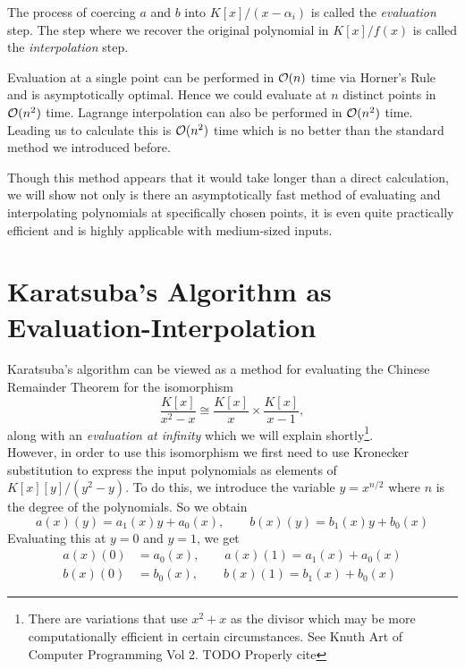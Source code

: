 The process of coercing $a$ and $b$ into $K[x]/ (x - \alpha_i)$ is called the \emph{evaluation} step. The step where we recover the original polynomial in $K[x]/f(x)$ is called the \emph{interpolation} step.

\medskip

Evaluation at a single point can be performed in $\mathcal O(n)$ time via Horner's Rule and is asymptotically optimal. Hence we could evaluate at $n$ distinct points in $\mathcal O(n^2)$ time. Lagrange interpolation can also be performed in $\mathcal O(n^2)$ time. Leading us to calculate this is $\mathcal O(n^2)$ time which is no better than the standard method we introduced before.

Though this method appears that it would take longer than a direct calculation, we will show not only is there an asymptotically fast method of evaluating and interpolating polynomials at specifically chosen points, it is even quite practically efficient and is highly applicable with medium-sized inputs.

\section{Karatsuba's Algorithm as Evaluation-Interpolation}%
\label{sec:Karatsuba's Algorithms as Evaluation-Interpolation}

Karatsuba's algorithm can be viewed as a method for evaluating the Chinese Remainder Theorem for the isomorphism
\[
    \frac{K[x]}{x^2 - x} \cong \frac{K[x]}{x} \times \frac{K[x]}{x-1},
\]
along with an \emph{evaluation at infinity} which we will explain shortly\footnote{There are variations that use $x^2 + x$ as the divisor which may be more computationally efficient in certain circumstances. See Knuth Art of Computer Programming Vol 2. TODO Properly cite}.\\
However, in order to use this isomorphism we first need to use Kronecker substitution to express the input polynomials as elements of $K[x][y]/(y^2 - y)$. To do this, we introduce the variable $y = x^{n/2}$ where $n$ is the degree of the polynomials. So we obtain
\[
    a(x)(y) = a_1(x)y + a_0(x), \qquad b(x)(y) = b_1(x)y + b_0(x)
\]
Evaluating this at $y = 0$ and $y = 1$, we get
\begin{align*}
    a(x)(0) &= a_0(x), \qquad a(x)(1) = a_1(x) + a_0(x)\\
    b(x)(0) &= b_0(x), \qquad b(x)(1) = b_1(x) + b_0(x)
\end{align*}

